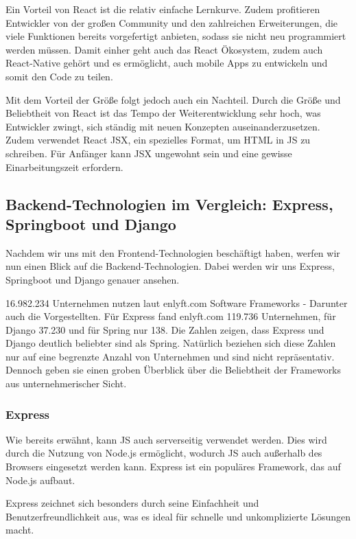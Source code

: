 \documentclass[biblatex]{lni}
\begin{document}
Ein Vorteil von React ist die relativ einfache Lernkurve. \cite{BStack}
Zudem profitieren Entwickler von der großen Community und den zahlreichen Erweiterungen,
die viele Funktionen bereits vorgefertigt anbieten,
sodass sie nicht neu programmiert werden müssen.
Damit einher geht auch das React Ökosystem, zudem auch React-Native gehört und es ermöglicht,
auch mobile Apps zu entwickeln und somit den Code zu teilen. \cite{RCTN}

Mit dem Vorteil der Größe folgt jedoch auch ein Nachteil. \cite{BStack}
Durch die Größe und Beliebtheit von React ist das Tempo der Weiterentwicklung sehr hoch,
was Entwickler zwingt, sich ständig mit neuen Konzepten auseinanderzusetzen.
Zudem verwendet React \ac{JSX}, ein spezielles Format, um \ac{HTML} in \ac{JS} zu schreiben. \cite{JSX}
Für Anfänger kann \ac{JSX} ungewohnt sein und eine gewisse Einarbeitungszeit erfordern.

\subsection{Backend-Technologien im Vergleich: Express, Springboot und Django}

Nachdem wir uns mit den Frontend-Technologien beschäftigt haben, werfen wir nun einen Blick auf die Backend-Technologien.
Dabei werden wir uns Express, Springboot und Django genauer ansehen.

16.982.234 Unternehmen nutzen laut enlyft.com Software Frameworks -
Darunter auch die Vorgestellten. \cite{eft}
Für Express fand enlyft.com 119.736 Unternehmen, für Django 37.230 und für Spring nur 138.
Die Zahlen zeigen, dass Express und Django deutlich beliebter sind als Spring.
Natürlich beziehen sich diese Zahlen nur auf eine begrenzte Anzahl von Unternehmen und sind nicht repräsentativ.
Dennoch geben sie einen groben Überblick über die Beliebtheit der Frameworks aus unternehmerischer Sicht.

\subsubsection{Express}

Wie bereits erwähnt, kann \ac{JS} auch serverseitig verwendet werden.
Dies wird durch die Nutzung von Node.js ermöglicht, wodurch \ac{JS} auch außerhalb des Browsers eingesetzt werden kann. \cite{MED}
Express ist ein populäres Framework, das auf Node.js aufbaut.

Express zeichnet sich besonders durch seine Einfachheit und Benutzerfreundlichkeit aus,
was es ideal für schnelle und unkomplizierte Lösungen macht. \cite{EiA}
\end{document}
